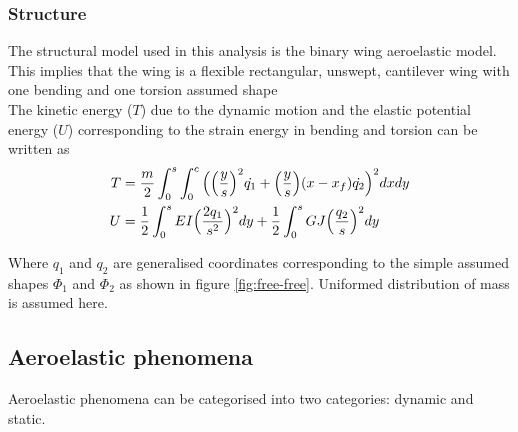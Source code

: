 \documentclass[11pt]{article}
\begin{document}
\subsubsection{Structure}
The structural model used in this analysis is the binary wing aeroelastic model. This implies that the wing is a flexible rectangular, unswept, cantilever wing with one bending and one torsion assumed shape \\

The kinetic energy ($T$) due to the dynamic motion and the elastic potential energy ($U$) corresponding to the strain energy in bending and torsion can be written as
\begin{align}
    T &= \frac{m}{2}\int_0^s \int_0^c \Big( \Big{(} \frac{y}{s}\Big{)}^2\dot{q_1}+\Big{(}\frac{y}{s}\Big{)}(x-x_f)\dot{q_2}\Big{)}^2dxdy\\
    U &= \frac{1}{2}\int_0^s EI \Big{(}\frac{2q_1}{s^2}\Big{)}^2dy+\frac{1}{2}\int_0^sGJ\Big{(}\frac{q_2}{s}\Big{)}^2dy
\end{align}

Where $q_1$ and $q_2$ are generalised coordinates corresponding to the simple assumed shapes $\Phi_1$ and $\Phi_2$ as shown in figure \ref{fig:free-free}. Uniformed distribution of mass is assumed here. 


\subsection{Aeroelastic phenomena}
Aeroelastic phenomena can be categorised into two categories: dynamic and static. 

\end{document}
